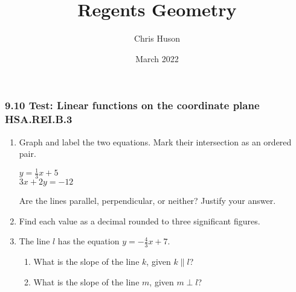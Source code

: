 \documentclass[12pt, twoside]{article}
\title{Regents Geometry}
\author{Chris Huson}
\date{March 2022}
\begin{document}
\subsubsection*{9.10 Test: Linear functions on the coordinate plane \hfill HSA.REI.B.3}
\begin{enumerate}
\item Graph and label the two equations. Mark their intersection as an ordered pair.
  \begin{multicols}{2}
    $y = \frac{1}{3}x+5$ \\
    $3x+2y = -12$
  \end{multicols}
  Are the lines parallel, perpendicular, or neither? Justify your answer.
  \vspace{1.5cm}
  \begin{center} %
  \end{center}

\item Find each value as a decimal rounded to three significant figures.
  \begin{enumerate}
  \end{enumerate}
  \vspace{0.5cm}

\newpage
\item The line $l$ has the equation $y=-\frac{4}{3} x+7$.
\begin{enumerate}
  \item What is the slope of the line $k$, given $k \parallel l$?
  \vspace{1.5cm}
  \item What is the slope of the line $m$, given $m \perp l$?
  \vspace{1.5cm}
\end{enumerate}


\end{enumerate}
\end{document}
